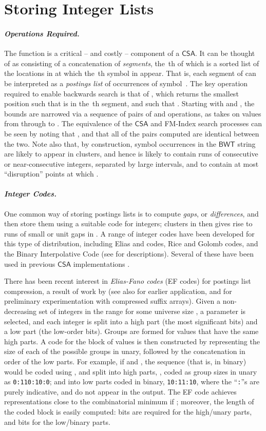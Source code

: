 \documentclass{llncs}
\newcommand{\myparagraph}[1]{\paragraph*{\normalsize\it#1.}}
\newcommand{\CSA}[0]{\ensuremath{\mathsf{CSA}}}
\newcommand{\BWT}[0]{\ensuremath{\mathsf{BWT}}}
\begin{document}
\section{Storing Integer Lists}
\label{sec-csa}

\myparagraph{Operations Required}


The function  is a
critical -- and costly -- component of a {\CSA}.
It can be thought of as consisting of a concatenation of 
{\emph{segments}}, the \,th of which is a sorted list of the
locations in  at which the \,th symbol in  appear.
That is, each segment of  can be interpreted as a
{\emph{postings list}} of occurrences of symbol~.
The key operation required to enable backwards search is that of
, which returns the smallest position
 such that  is in the \,th segment,
and such that .
Starting with  and , the  bounds are
narrowed via a sequence of  pairs of 
and  operations, as  takes on
values from  through to .
The equivalence of the {\CSA} and FM-Index search processes can be
seen by noting that
, and that all of
the  pairs computed are identical between the two.
Note also that, by construction, symbol occurrences in the {\BWT}
string are likely to appear in clusters, and hence  is likely
to contain runs of consecutive or near-consecutive integers,
separated by large intervals, and to contain at most 
``disruption'' points at which .

\myparagraph{Integer Codes}


One common way of storing postings lists is to compute {\emph{gaps}},
or {\emph{differences}}, and then store them using a suitable code
for integers; clusters in  then gives rise to runs of small or
unit gaps in .
A range of integer codes have been developed for this type of
distribution, including Elias  and  codes, Rice and
Golomb codes, and the Binary Interpolative Code (see
{\citet[Chapter~3]{mt02caca}} for descriptions).
Several of these have been used in previous {\CSA} implementations
{\citep{s-jalg03}}.


There has been recent interest in {\emph{Elias-Fano codes}} (EF
codes) for postings list compression, a result of work by
{\citet{vigna13wsdm}} (see also {\citet{am98sigir}} for earlier
application, and {\citet{gnp-jda15}} for preliminary experimentation
with compressed suffix arrays).
Given a non-decreasing set of  integers in the range  for some universe size , a parameter  is selected,
and each integer is split into a high part (the most significant
 bits) and a low part (the  low-order bits).
Groups are formed for values that have the same high parts.
A code for the block of  values is then constructed by
representing the size of each of the  possible groups in
unary, followed by the concatenation in order of the  low parts.
For example, if  and , the sequence  (that is,
 in binary) would be coded using , and
split into high parts, , coded as group sizes in unary as
{\tt{0:110:10:0}}; and into low parts coded in binary,
{\tt{10:11:10}}, where the ``{\tt{:}}''s are purely indicative, and
do not appear in the output.
The EF code achieves representations close to the combinatorial
minimum if ; moreover, the length
of the coded block is easily computed:  bits are
required for the high/unary parts, and  bits for the
low/binary parts.
\end{document}
